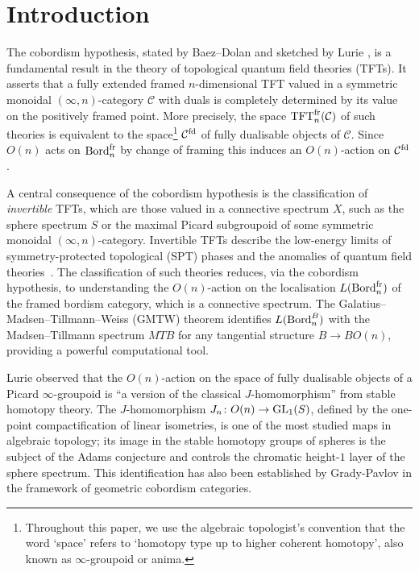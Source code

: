 \documentclass{amsart}
\begin{document}
\section{Introduction}
The cobordism hypothesis, stated by Baez--Dolan \cite{baez1995higher} and sketched by Lurie \cite{MR2555928}, is a fundamental result in the theory of topological quantum field theories (TFTs). It asserts that a fully extended framed $n$-dimensional TFT valued in a symmetric monoidal $(\infty,n)$-category $\mathcal{C}$ with duals is completely determined by its value on the positively framed point. More precisely, the space $\mathrm{TFT}_n^{\mathrm{fr}}(\mathcal{C})$ of such theories is equivalent to the space\footnote{Throughout this paper, we use the algebraic topologist's convention that the word `space' refers to `homotopy type up to higher coherent homotopy', also known as $\infty$-groupoid or anima.} $\mathcal{C}^{\mathrm{fd}}$ of fully dualisable objects of $\mathcal{C}$. Since $O(n)$ acts on $\operatorname{Bord}_n^{\mathrm{fr}}$ by change of framing this induces an $O(n)$-action on $\mathcal{C}^{\mathrm{fd}}$.


A central consequence of the cobordism hypothesis is the classification of \emph{invertible} TFTs, which are those valued in a connective spectrum $X$, such as the sphere spectrum $S$ or the maximal Picard subgroupoid of some symmetric monoidal $(\infty,n)$-category. Invertible TFTs describe the low-energy limits of symmetry-protected topological (SPT) phases and the anomalies of quantum field theories~\cite{freed2021reflection,Witten_2016}. The classification of such theories reduces, via the cobordism hypothesis, to understanding the $O(n)$-action on the localisation $L(\operatorname{Bord}_n^{\mathrm{fr}})$ of the framed bordism category, which is a connective spectrum. The Galatius--Madsen--Tillmann--Weiss (GMTW) theorem \cite{MR2506750} identifies $L(\operatorname{Bord}_n^{B})$ with the Madsen--Tillmann spectrum $MTB$ for any tangential structure $B \to BO(n)$, providing a powerful computational tool.

Lurie observed that the $O(n)$-action on the space of fully dualisable objects of a Picard $\infty$-groupoid is ``a version of the classical $J$-homomorphism'' from stable homotopy theory. The $J$-homomorphism $J_n\colon O(n) \to \mathrm{GL}_1(S)$, defined by the one-point compactification of linear isometries, is one of the most studied maps in algebraic topology; its image in the stable homotopy groups of spheres is the subject of the Adams conjecture \cite{adams1963groups} and controls the chromatic height-$1$ layer of the sphere spectrum. This identification has also been established by Grady-Pavlov \cite[Theorem~5.0.6]{grady2021geometric} in the framework of geometric cobordism categories.
\end{document}
